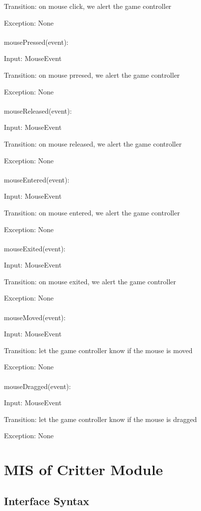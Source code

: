 \documentclass[12,english]{article}
\begin{document}
		Transition: on mouse click, we alert the game controller
		
		Exception: None\\
		\\
		mousePressed(event):
		
		Input: MouseEvent
		
		Transition: on mouse prresed, we alert the game controller
		
		Exception: None\\
		\\
		mouseReleased(event):
		
		Input: MouseEvent
		
		Transition: on mouse released, we alert the game controller
		
		Exception: None\\
		\\
		mouseEntered(event):
		
		Input: MouseEvent
		
		Transition: on mouse entered, we alert the game controller
		
		Exception: None\\
		\\
		mouseExited(event):
		
		Input: MouseEvent
		
		Transition: on mouse exited, we alert the game controller
		
		Exception: None\\
		\\
		mouseMoved(event):
		
		Input: MouseEvent
		
		Transition: let the game controller know if the mouse is moved
		
		Exception: None\\
		\\
		mouseDragged(event):
		
		Input: MouseEvent
		
		Transition: let the game controller know if the mouse is dragged
		
		Exception: None
		\\
		
		
\section{MIS of Critter Module}
	\subsection{Interface Syntax}
\end{document}

